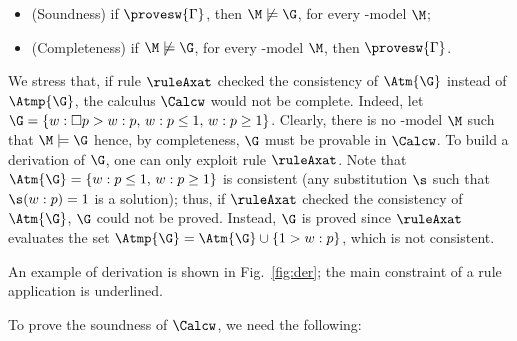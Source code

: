 \begin{itemize}
\item (Soundness) if $\provesw{\Gamma}$, then $\M\not\models\G$, for
  every \GWM-model $\M$;
\item (Completeness) if $\M\not\models\G$, for every \GWM-model  $\M$, then $\provesw{\Gamma}$.
\end{itemize}
We stress that, if   rule $\ruleAxat$   checked the
consistency of $\Atm{\G}$ instead of  $\Atmp{\G}$, the calculus $\Calcw$ would  not be complete.
Indeed, let  $\G=\{w : \Box p > w:p,\,w:p\leq 1,\,w:p\geq 1\}$.
Clearly, there is no  \GWM-model   $\M$  such that
$\M\models \G$ hence,  by completeness,  $\G$ must  be  provable in $\Calcw$.
To build a derivation of $\G$,  one can only exploit  rule $\ruleAxat$.
Note that $\Atm{\G}=\{w:p\leq 1,\,w:p\geq 1 \}$
is  consistent (any substitution $\s$ such that $\s(w:p)=1$ is a solution);
thus, if $\ruleAxat$  checked the consistency of  $\Atm{\G}$,
   $\G$ could not be proved.
Instead, $\G$ is proved  since $\ruleAxat$   evaluates
the set $\Atmp{\G} =\Atm{\G}\cup \{1 > w:p\}$, which  is not consistent.



An example of derivation is shown in Fig.~\ref{fig:der};
 the main constraint of a rule  application is underlined. 


To prove the soundness of $\Calcw$, we need the
following:

